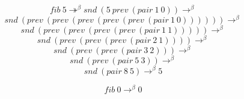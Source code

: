 \documentclass[a4paper,12pt]{article}
\theoremstyle{plain} %
\theoremstyle{definition} %
\theoremstyle{remark} %
\begin{document}
$$fib \ 5 \twoheadrightarrow^{\beta} snd \ (5 \ prev \ (pair \ 1 \ 0)) \rightarrow^{\beta}$$
$$snd \ (prev \ (prev \ (prev \ (prev \ (prev \  (pair \ 1 \ 0)))))) \rightarrow^{\beta}$$
$$snd \ (prev \ (prev \ (prev \ (prev \ (pair \ 1 \ 1))))) \rightarrow^{\beta}$$
$$snd \ (prev \ (prev \ (prev \ (pair \ 2 \ 1)))) \rightarrow^{\beta}$$
$$snd \ (prev \ (prev \ (pair \ 3 \ 2))) \rightarrow^{\beta}$$
$$snd \ (prev \ (pair \ 5 \ 3)) \rightarrow^{\beta}$$
$$snd \ (pair \ 8 \ 5) \rightarrow^{\beta} 5$$

$$fib \ 0 \rightarrow^{\beta} 0$$
\end{document}
